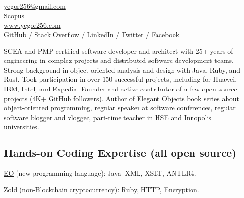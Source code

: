 \documentclass{yb}
\begin{document}
    \ybPrintPhoto{}

    \section*{\Large {}}

    \href{mailto:yegor256@gmail.com}{yegor256@gmail.com}\\%
    \href{https://www.scopus.com/authid/detail.uri?authorId=30367443600}{Scopus}\\%
    \href{https://www.yegor256.com}{www.yegor256.com}\\%
    \href{https://github.com/yegor256}{GitHub} /
    \href{https://stackexchange.com/users/63162/yegor256}{Stack Overflow} /
    \href{https://www.linkedin.com/in/yegor256}{LinkedIn} /
    \href{https://twitter.com/intent/follow?screen_name=yegor256}{Twitter} /
    \href{https://www.facebook.com/yegor256}{Facebook}

    \vspace*{12pt}

    SCEA and PMP certified software developer and architect with
    25+ years of engineering in complex projects and distributed software
    development teams. Strong background in object-oriented analysis and design
    with Java, Ruby, and Rust. Took participation in over 150 successful projects,
    including for Huawei, IBM, Intel, and Expedia. \href{https://www.yegor256.com/pets.html}{Founder}
    and \href{https://github.com/yegor256}{active contributor} of
    a few open source projects (\href{https://github.com/yegor256}{4K+} GitHub followers). Author of
    \href{https://www.yegor256.com/elegant-objects.html}{Elegant Objects}
    book series about object-oriented programming,
    regular \href{https://www.yegor256.com/talks.html}{speaker} at software conferences, regular software
    \href{https://www.yegor256.com}{blogger} and \href{https://www.youtube.com/c/yegor256}{vlogger},
    part-time teacher in \href{https://www.hse.ru/en/}{HSE} and \href{https://innopolis.university/en/}{Innopolis} universities.

    \subsection*{Hands-on Coding Expertise (all open source)}

    \href{https://www.eolang.org}{EO} (new programming language):
    Java, XML, XSLT, ANTLR4.

    \href{https://www.zold.io}{Zold} (non-Blockchain cryptocurrency):
    Ruby, HTTP, Encryption.
\end{document}
